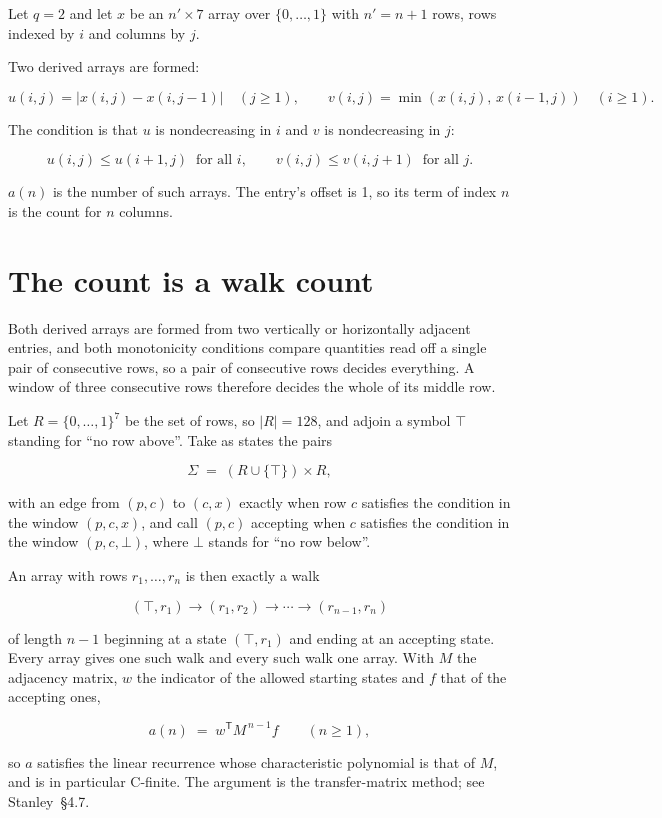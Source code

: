 \documentclass[11pt]{article}
\theoremstyle{definition}
\begin{document}
Let $q = 2$ and let $x$ be an $n' \times 7$ array over $\{0,\dots,1\}$ with $n' = n + 1$ rows, rows indexed by $i$ and columns by $j$.

Two derived arrays are formed:

\[u(i,j) = \lvert x(i,j) - x(i,j{-}1)\rvert\quad (j \ge 1), \qquad v(i,j) = \min(x(i,j),\,x(i{-}1,j))\quad (i \ge 1).\]

The condition is that $u$ is nondecreasing in $i$ and $v$ is nondecreasing in $j$:

\[u(i,j) \le u(i{+}1,j) \ \text{ for all } i, \qquad v(i,j) \le v(i,j{+}1) \ \text{ for all } j.\]

$a(n)$ is the number of such arrays. The entry's offset is 1, so its term of index $n$ is the count for $n$ columns.

\section{The count is a walk count}

Both derived arrays are formed from two vertically or horizontally adjacent entries, and both monotonicity conditions compare quantities read off a single pair of consecutive rows, so a pair of consecutive rows decides everything. A window of three consecutive rows therefore decides the whole of its middle row.

Let $R = \{0,\dots,1\}^{7}$ be the set of rows, so $|R| = 128$, and adjoin a symbol $\top$ standing for ``no row above''. Take as states the pairs

\[\Sigma \;=\; (R \cup \{\top\}) \times R,\]

with an edge from $(p,c)$ to $(c,x)$ exactly when row $c$ satisfies the condition in the window $(p,c,x)$, and call $(p,c)$ accepting when $c$ satisfies the condition in the window $(p,c,\bot)$, where $\bot$ stands for ``no row below''.

An array with rows $r_1,\dots,r_n$ is then exactly a walk

\[(\top,r_1) \to (r_1,r_2) \to \cdots \to (r_{n-1},r_n)\]

of length $n-1$ beginning at a state $(\top,r_1)$ and ending at an accepting state. Every array gives one such walk and every such walk one array. With $M$ the adjacency matrix, $w$ the indicator of the allowed starting states and $f$ that of the accepting ones,

\[a(n) \;=\; w^{\mathsf T} M^{\,n-1} f \qquad (n \ge 1),\]

so $a$ satisfies the linear recurrence whose characteristic polynomial is that of $M$, and is in particular C-finite. The argument is the transfer-matrix method; see Stanley~\S4.7.
\end{document}
